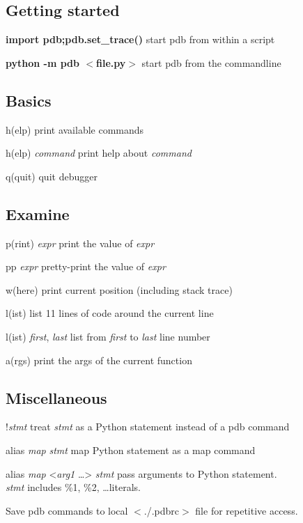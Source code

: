 \documentclass[10pt,landscape,a4paper]{article}
\newcommand{\keystroke}[1]{$<$#1$>$}
\begin{document}
  \begin{multicols}{2}
    \subsection{Getting started}
      \begin{eqlist}
        \item[{\bfseries import pdb;pdb.set\_trace()}] start pdb from within a script
        \item[{\bfseries python -m pdb \keystroke{file.py}}] start pdb from the commandline
      \end{eqlist}

    \subsection{Basics}
      \begin{eqlist}
        \item[h(elp)] print available commands
        \item[h(elp) \textit{command}] print help about \textit{command}
        \item[q(quit)] quit debugger
      \end{eqlist}

    \subsection{Examine}
      \begin{eqlist}
        \item[p(rint) \textit{expr}] print the value of \textit{expr}
        \item[pp \textit{expr}] pretty-print the value of \textit{expr}
        \item[w(here)] print current position (including stack trace)
        \item[l(ist)] list 11 lines of code around the current line
        \item[l(ist) \textit{first}, \textit{last}] list from \textit{first} to \textit{last} line number
        \item[a(rgs)] print the args of the current function
      \end{eqlist}

    \subsection{Miscellaneous}
      \begin{eqlist}
        \item[!\textit{stmt}] treat \textit{stmt} as a Python statement instead of a pdb command
        \item[alias \textit{map} \textit{stmt}] map Python statement as a map command
        \item[alias \textit{map} <\textit{arg1} \ldots> \textit{stmt}] pass arguments to Python statement. \\
            \textit{stmt} includes \%1, \%2, \ldots literals.
      \end{eqlist}
      Save pdb commands to local \keystroke{./.pdbrc} file for repetitive access.


\end{multicols}
\end{document}
